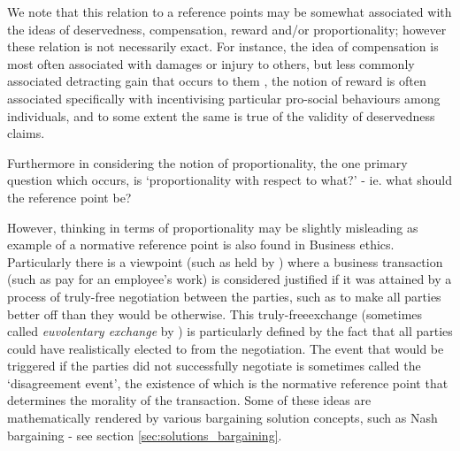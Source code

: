 We note that this relation to a reference points may be somewhat associated with the ideas of deservedness, compensation, reward and/or proportionality; however these relation is not necessarily exact.
For instance, the idea of compensation is most often associated with damages or injury to others, but less commonly associated detracting gain that occurs to them \DIFaddbegin {}\DIFaddend , the notion of reward is often associated specifically with incentivising particular pro-social behaviours among individuals, and to some extent the same is true of the validity of deservedness claims.
\DIFdelbegin %

\DIFdelend Furthermore in considering the notion of proportionality, the one primary question which occurs, is `proportionality with respect to what?' - ie. what should the reference point be?

However, thinking in terms of proportionality may be slightly misleading as example of a normative reference point is also found in Business ethics.
Particularly there is a viewpoint (such as held by \cite{ExecutiveCompensationUnjustorJustRight}) where a business transaction (such as pay for an employee's work) is considered justified if it was attained by a process of truly-free negotiation between the parties, such as to make all parties better off than they would be otherwise.
This \DIFaddbegin {}\DIFaddend truly-free\DIFaddbegin {}\DIFaddend exchange (sometimes called \textit{euvolentary exchange} by \cite{Guzman2019}) is particularly defined by the fact that all parties could have realistically elected to \DIFdelbegin {}\DIFdelend \DIFaddbegin {}\DIFaddend from the negotiation.
The event that would be triggered if the parties did not successfully negotiate is sometimes called the `disagreement event', the existence of which is the normative reference point that determines the morality of the transaction.
Some of these ideas are mathematically rendered by various bargaining solution concepts, such as Nash bargaining - see section \ref{sec:solutions_bargaining}.

